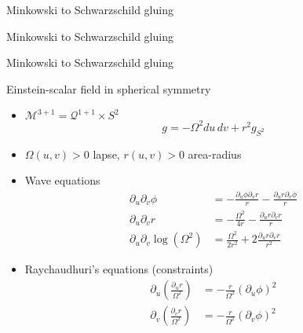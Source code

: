 \documentclass[compress,usenames,dvipsnames,8pt]{beamer}
\theoremstyle{definition}
\renewcommand{\(}{\begin{columns}}
\renewcommand{\)}{\end{columns}}
\newcommand{\<}[1]{\begin{column}{#1}}
\renewcommand{\>}{\end{column}}
\begin{document}
\begin{frame}{Minkowski to Schwarzschild gluing}

\begin{figure}
 \def\svgwidth{20pc}

\end{figure}

\end{frame}

\begin{frame}{Minkowski to Schwarzschild gluing}

\addtocounter{framenumber}{-1}
\begin{figure}
 \def\svgwidth{20pc}

\end{figure}

\end{frame}

\begin{frame}{Minkowski to Schwarzschild gluing}

\addtocounter{framenumber}{-1}
\begin{figure}
 \def\svgwidth{20pc}

\end{figure}

\end{frame}




\begin{frame}{Einstein-scalar field in spherical symmetry}

\begin{itemize}
\item $\mathcal M^{3+1}=\mathcal Q^{1+1}\times S^2$ 
\[g=-\Omega^2 du \,dv+r^2 g_{S^2}\] 
\item $\Omega(u,v)>0$ lapse, $r(u,v)>0$ area-radius  \pause
\item Wave equations 
\begin{align}\label{eq:CSF-wave-equation}
\partial_u \partial_v \phi &= - \frac{\partial_u\phi\partial_v r}{r} - \frac{\partial_u r\partial_v\phi}{r}  \\
\label{eq:CSF-equation-for-r}
\partial_u \partial_v r &= -\frac{\Omega^2}{4r} - \frac{\partial_ur \partial_vr}{r}  \\
\label{eq:CSF-equation-for-Omega}
 \partial_u\partial_v\log(\Omega^2)&= \frac{\Omega^2}{2r^2}+2\frac{\partial_u r\partial_v r}{r^2}  
\end{align}\pause
\item Raychaudhuri's equations (constraints)
\begin{align}
\partial_u\left(\frac{\partial_u r}{\Omega^2}\right)&=-\frac{r}{\Omega^2}(\partial_u\phi)^2 \label{eq:CSF-Raychaudhuri-u}\\
\label{eq:CSF-Raychaudhuri-v}
\partial_v\left(\frac{\partial_v r}{\Omega^2}\right)&=-\frac{r}{\Omega^2}(\partial_v\phi)^2
\end{align}
\end{itemize}

\end{frame}
\end{document}
